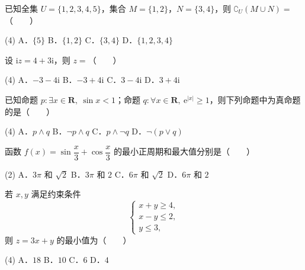 


\begin{question}
已知全集 $U=\{1,2,3,4,5\}$，集合 $M=\{1,2\}$，$N=\{3,4\}$，则 $\complement_U(M\cup N)=$\mbox{（　　）}

\begin{gkopts}(4)
\task A．$\{5\}$
\task B．$\{1,2\}$
\task C．$\{3,4\}$
\task D．$\{1,2,3,4\}$
\end{gkopts}

\end{question}
\begin{question}
设 $\mathrm iz=4+3\mathrm i$，则 $z=$\mbox{（　　）}

\begin{gkopts}(4)
\task A．$-3-4\mathrm i$
\task B．$-3+4\mathrm i$
\task C．$3-4\mathrm i$
\task D．$3+4\mathrm i$
\end{gkopts}

\end{question}
\begin{question}
已知命题 $p:\exists x\in\mathbf R,\ \sin x<1$；命题 $q:\forall x\in\mathbf R,\ \mathrm e^{|x|}\geqslant1$，则下列命题中为真命题的是\mbox{（　　）}

\begin{gkopts}(4)
\task A．$p\land q$
\task B．$\neg p\land q$
\task C．$p\land\neg q$
\task D．$\neg(p\lor q)$
\end{gkopts}

\end{question}
\begin{question}
函数 $f(x)=\sin\dfrac{x}{3}+\cos\dfrac{x}{3}$ 的最小正周期和最大值分别是\mbox{（　　）}

\begin{gkopts}(2)
\task A．$3\pi$ 和 $\sqrt2$
\task B．$3\pi$ 和 $2$
\task C．$6\pi$ 和 $\sqrt2$
\task D．$6\pi$ 和 $2$
\end{gkopts}

\end{question}
\begin{question}
若 $x,y$ 满足约束条件
\nopagebreak[4]
\[
\begin{cases}
x+y\geqslant4,\\
x-y\leqslant2,\\
y\leqslant3,
\end{cases}
\]
则 $z=3x+y$ 的最小值为\mbox{（　　）}

\begin{gkopts}(4)
\task A．$18$
\task B．$10$
\task C．$6$
\task D．$4$
\end{gkopts}

\end{question}

